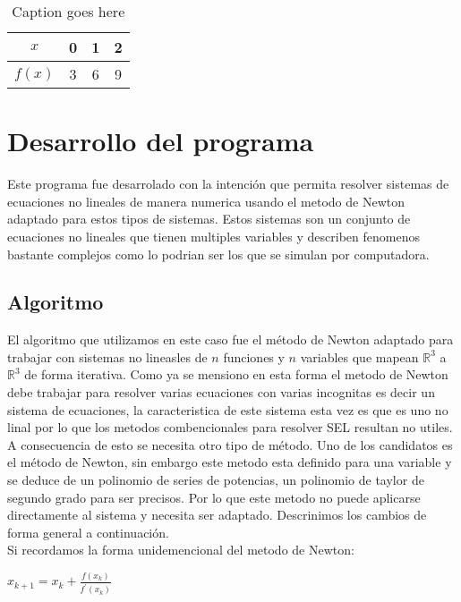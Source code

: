 \documentclass[11pt]{article}
\begin{document}
\begin{table}[H]
	\centering
		\begin{tabular}{|c|c|c|c|}\hline
		$x$ &0&1&2\\ \hline
		$f(x)$ &3&6&9\\ \hline		
		\end{tabular}
	\caption{Caption goes here}
	\label{tab:data1}
\end{table}


\section{Desarrollo del programa}
Este programa fue desarrolado con la intención que permita resolver sistemas de ecuaciones no lineales de manera numerica usando el metodo de Newton adaptado para estos tipos de sistemas. Estos sistemas son un conjunto de ecuaciones no lineales que tienen multiples variables y describen fenomenos bastante complejos como lo podrian ser los que se simulan por computadora. 

\subsection{Algoritmo}
El algoritmo que utilizamos en este caso fue el  método de Newton adaptado para trabajar con sistemas no lineasles de $n$ funciones y $n$ variables que mapean $\mathbb{R}^3$ a $\mathbb{R}^3$ de forma iterativa. Como ya se mensiono en esta forma el metodo de Newton debe trabajar para resolver varias ecuaciones con varias incognitas es decir un sistema de ecuaciones, la caracteristica de este sistema esta vez es que es uno no linal por lo que los metodos combencionales para resolver SEL resultan no utiles. A consecuencia de esto se necesita otro tipo de método. Uno de los candidatos es el método de Newton, sin embargo este metodo esta definido para una variable y se deduce de un polinomio de series de potencias, un polinomio de taylor de segundo grado para ser precisos. Por lo que este metodo no puede aplicarse directamente al sistema y  necesita ser adaptado. Descrinimos los cambios de forma general a continuación.\\

Si recordamos la forma unidemencional del metodo de Newton:\\
\begin{center}
$x_{k+1} = x_{k} + \frac{f(x_{k})}{f^\prime(x_{k})} \label{eq:1}$\\
\end{center}
\end{document}
